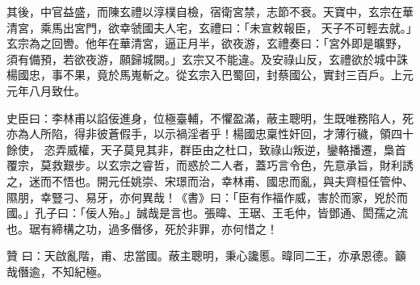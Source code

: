 \begin{pinyinscope}
 其後，中官益盛，而陳玄禮以淳樸自檢，宿衛宮禁，志節不衰。天寶中，玄宗在華清宮，乘馬出宮門，欲幸虢國夫人宅，玄禮曰：「未宣敕報臣，
 天子不可輕去就。」玄宗為之回轡。他年在華清宮，逼正月半，欲夜游，玄禮奏曰：「宮外即是曠野，須有備預，若欲夜游，願歸城闕。」玄宗又不能違。及安祿山反，玄禮欲於城中誅楊國忠，事不果，竟於馬嵬斬之。從玄宗入巴蜀回，封蔡國公，實封三百戶。上元元年八月致仕。



 史臣曰：李林甫以諂佞進身，位極臺輔，不懼盈滿，蔽主聰明，生既唯務陷人，死亦為人所陷，得非彼蒼假手，以示禍淫者乎！楊國忠稟性奸回，才薄行穢，領四十餘使，
 恣弄威權，天子莫見其非，群臣由之杜口，致祿山叛逆，鑾輅播遷，梟首覆宗，莫救艱步。以玄宗之睿哲，而惑於二人者，蓋巧言令色，先意承旨，財利誘之，迷而不悟也。開元任姚崇、宋璟而治，幸林甫、國忠而亂，與夫齊桓任管仲、隰朋，幸豎刁、易牙，亦何異哉！《書》曰：「臣有作福作威，害於而家，兇於而國。」孔子曰：「佞人殆。」誠哉是言也。張暐、王琚、王毛仲，皆鄧通、閎孺之流也。琚有締構之功，過多僭侈，死於非罪，亦何惜之！



 贊
 曰：天啟亂階，甫、忠當國。蔽主聰明，秉心讒慝。暐同二王，亦承恩德。籲哉僭逾，不知紀極。



\end{pinyinscope}